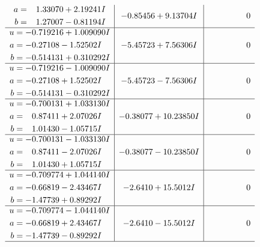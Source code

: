 \documentclass[1p]{elsarticle_modified}
\theoremstyle{definition}
\begin{document}
$$\begin{array}{c|c|c}
\begin{aligned}
a &= \phantom{-}1.33070 + 2.19241 I \\
b &= \phantom{-}1.27007 - 0.81194 I\end{aligned}
 & -0.85456 + 9.13704 I & \phantom{-0.000000 } 0 \\ \hline\begin{aligned}
u &= -0.719216 + 1.009090 I \\
a &= -0.27108 - 1.52502 I \\
b &= -0.514131 + 0.310292 I\end{aligned}
 & -5.45723 + 7.56306 I & \phantom{-0.000000 } 0 \\ \hline\begin{aligned}
u &= -0.719216 - 1.009090 I \\
a &= -0.27108 + 1.52502 I \\
b &= -0.514131 - 0.310292 I\end{aligned}
 & -5.45723 - 7.56306 I & \phantom{-0.000000 } 0 \\ \hline\begin{aligned}
u &= -0.700131 + 1.033130 I \\
a &= \phantom{-}0.87411 + 2.07026 I \\
b &= \phantom{-}1.01430 - 1.05715 I\end{aligned}
 & -0.38077 + 10.23850 I & \phantom{-0.000000 } 0 \\ \hline\begin{aligned}
u &= -0.700131 - 1.033130 I \\
a &= \phantom{-}0.87411 - 2.07026 I \\
b &= \phantom{-}1.01430 + 1.05715 I\end{aligned}
 & -0.38077 - 10.23850 I & \phantom{-0.000000 } 0 \\ \hline\begin{aligned}
u &= -0.709774 + 1.044140 I \\
a &= -0.66819 - 2.43467 I \\
b &= -1.47739 + 0.89292 I\end{aligned}
 & -2.6410 + 15.5012 I & \phantom{-0.000000 } 0 \\ \hline\begin{aligned}
u &= -0.709774 - 1.044140 I \\
a &= -0.66819 + 2.43467 I \\
b &= -1.47739 - 0.89292 I\end{aligned}
 & -2.6410 - 15.5012 I & \phantom{-0.000000 } 0\\
 \hline 
 \end{array}$$\newpage$$\begin{array}{c|c|c}  

\end{array}$$
\end{document}
